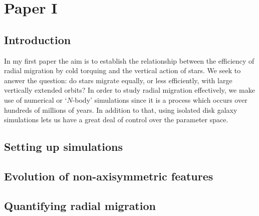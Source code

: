 \chapter{Paper I}\label{chap:paper1}
\section{Introduction}\label{sec:p1-intro}
In my first paper the aim is to establish the relationship between the efficiency of radial migration by cold torquing and the vertical action of stars. We seek to answer the question: do stars migrate equally, or less efficiently, with large vertically extended orbits? In order to study radial migration effectively, we make use of numerical or `$N$-body' simulations since it is a process which occurs over hundreds of millions of years. In addition to that, using isolated disk galaxy simulations lets us have a great deal of control over the parameter space. 



\section{Setting up simulations}\label{sec:p1-simulations}

\section{Evolution of non-axisymmetric features}\label{sec:p1-evolution}

\section{Quantifying radial migration}\label{sec:p1-quantifying}